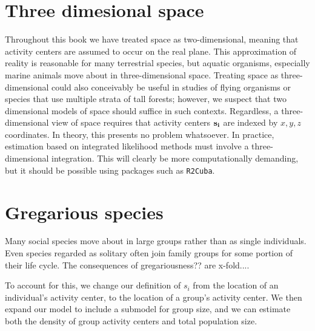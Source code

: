 \section{Three dimesional space}

Throughout this book we have treated space as
two-dimensional, meaning that activity centers are assumed to occur on
the real plane. This approximation of reality is reasonable for many
terrestrial species, but aquatic organisms, especially marine animals
move about in three-dimensional space. Treating space as
three-dimensional could also conceivably be useful in studies of flying organisms
or species that use multiple strata of tall forests; however, we
suspect that two dimensional models of space should suffice in such
contexts. Regardless, a three-dimensional view of space requires that
activity centers $\bf s_i$ are indexed by
$x,y,z$ coordinates. In theory, this presents no problem whatsoever. In
practice, estimation based on integrated likelihood methods must
involve a three-dimensional integration. This will clearly be more
computationally demanding, but it should be possible using packages
such as {\tt R2Cuba}.




\section{Gregarious species}

Many social species move about in large groups rather than as single
individuals. Even species regarded as solitary often join family
groups for some portion of their life cycle. The consequences of
gregariousness?? are x-fold....

To account for this, we change our definition of $s_i$ from the
location of an individual's activity center, to the location of a
group's activity center. We then expand our model to include a
submodel for group size, and we can estimate both the density of group
activity centers and total population size.
